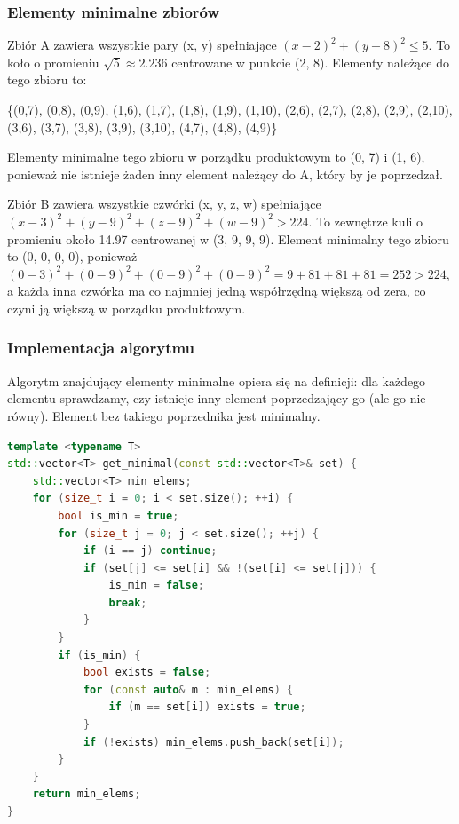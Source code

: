 \documentclass{article}
\begin{document}
\subsubsection*{Elementy minimalne zbiorów}

Zbiór A zawiera wszystkie pary (x, y) spełniające \((x - 2)^2 + (y - 8)^2 \leq 5\). To koło o promieniu \(\sqrt{5} \approx 2.236\) centrowane w punkcie (2, 8). Elementy należące do tego zbioru to:

\begin{center}
\{(0,7), (0,8), (0,9), (1,6), (1,7), (1,8), (1,9), (1,10), (2,6), (2,7), (2,8), (2,9), (2,10), (3,6), (3,7), (3,8), (3,9), (3,10), (4,7), (4,8), (4,9)\}
\end{center}

Elementy minimalne tego zbioru w porządku produktowym to (0, 7) i (1, 6), ponieważ nie istnieje żaden inny element należący do A, który by je poprzedzał.

Zbiór B zawiera wszystkie czwórki (x, y, z, w) spełniające \((x - 3)^2 + (y - 9)^2 + (z - 9)^2 + (w - 9)^2 > 224\). To zewnętrze kuli o promieniu około 14.97 centrowanej w (3, 9, 9, 9). Element minimalny tego zbioru to (0, 0, 0, 0), ponieważ \((0 - 3)^2 + (0 - 9)^2 + (0 - 9)^2 + (0 - 9)^2 = 9 + 81 + 81 + 81 = 252 > 224\), a każda inna czwórka ma co najmniej jedną współrzędną większą od zera, co czyni ją większą w porządku produktowym.

\subsubsection*{Implementacja algorytmu}

Algorytm znajdujący elementy minimalne opiera się na definicji: dla każdego elementu sprawdzamy, czy istnieje inny element poprzedzający go (ale go nie równy). Element bez takiego poprzednika jest minimalny.

\begin{lstlisting}[language=C++]
template <typename T>
std::vector<T> get_minimal(const std::vector<T>& set) {
    std::vector<T> min_elems;
    for (size_t i = 0; i < set.size(); ++i) {
        bool is_min = true;
        for (size_t j = 0; j < set.size(); ++j) {
            if (i == j) continue;
            if (set[j] <= set[i] && !(set[i] <= set[j])) {
                is_min = false;
                break;
            }
        }
        if (is_min) {
            bool exists = false;
            for (const auto& m : min_elems) {
                if (m == set[i]) exists = true;
            }
            if (!exists) min_elems.push_back(set[i]);
        }
    }
    return min_elems;
}
\end{lstlisting}
\end{document}

